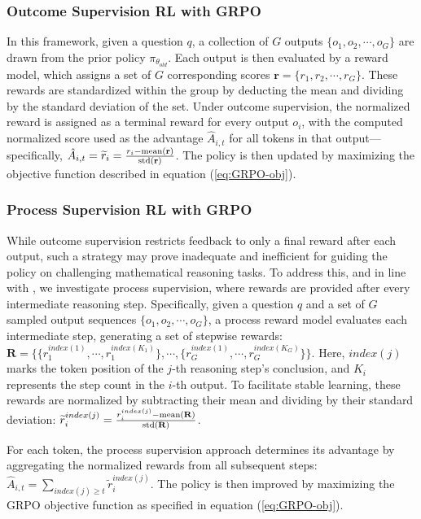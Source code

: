 \begin{itemize}[topsep=0pt]
\begin{itemize}[topsep=0pt]
\subsubsection{Outcome Supervision RL with GRPO} In this framework, given a question $q$, a collection of $G$ outputs $\{o_1, o_2, \cdots, o_G\}$ are drawn from the prior policy $\pi_{\theta_{old}}$. Each output is then evaluated by a reward model, which assigns a set of $G$ corresponding scores $\mathbf{r}=\{r_1, r_2, \cdots, r_G\}$. These rewards are standardized within the group by deducting the mean and dividing by the standard deviation of the set. Under outcome supervision, the normalized reward is assigned as a terminal reward for every output $o_i$, with the computed normalized score used as the advantage $\hat{A}_{i, t}$ for all tokens in that output—specifically, $\hat{A}_{i, t} = \widetilde{r}_i = \frac{r_i- {\rm mean}(\mathbf{r})}{{\rm std}(\mathbf{r})}$. The policy is then updated by maximizing the objective function described in equation (\ref{eq:GRPO-obj}).

\subsubsection{Process Supervision RL with GRPO}  
While outcome supervision restricts feedback to only a final reward after each output, such a strategy may prove inadequate and inefficient for guiding the policy on challenging mathematical reasoning tasks. To address this, and in line with \cite{wang2023math}, we investigate process supervision, where rewards are provided after every intermediate reasoning step. Specifically, given a question $q$ and a set of $G$ sampled output sequences $\{o_1, o_2, \cdots, o_G\}$, a process reward model evaluates each intermediate step, generating a set of stepwise rewards: $\mathbf{R} = \{ \{r_1^{index(1)},\cdots,r_1^{index(K_1)}\}, \cdots,  \{r_G^{index(1)},\cdots,r_G^{index(K_G)}\} \}$. Here, $index(j)$ marks the token position of the $j$-th reasoning step's conclusion, and $K_i$ represents the step count in the $i$-th output. To facilitate stable learning, these rewards are normalized by subtracting their mean and dividing by their standard deviation: $\widetilde{r}_i^{index(j)} = \frac{r_i^{index(j)} - {\rm mean(\mathbf{R})}}{{\rm std(\mathbf{R})}}$.

For each token, the process supervision approach determines its advantage by aggregating the normalized rewards from all subsequent steps: $\hat{A}_{i, t} = \sum_{index(j) \ge t} \widetilde{r}_i^{index(j)}$. The policy is then improved by maximizing the GRPO objective function as specified in equation (\ref{eq:GRPO-obj}).


\end{itemize}
\end{itemize}
